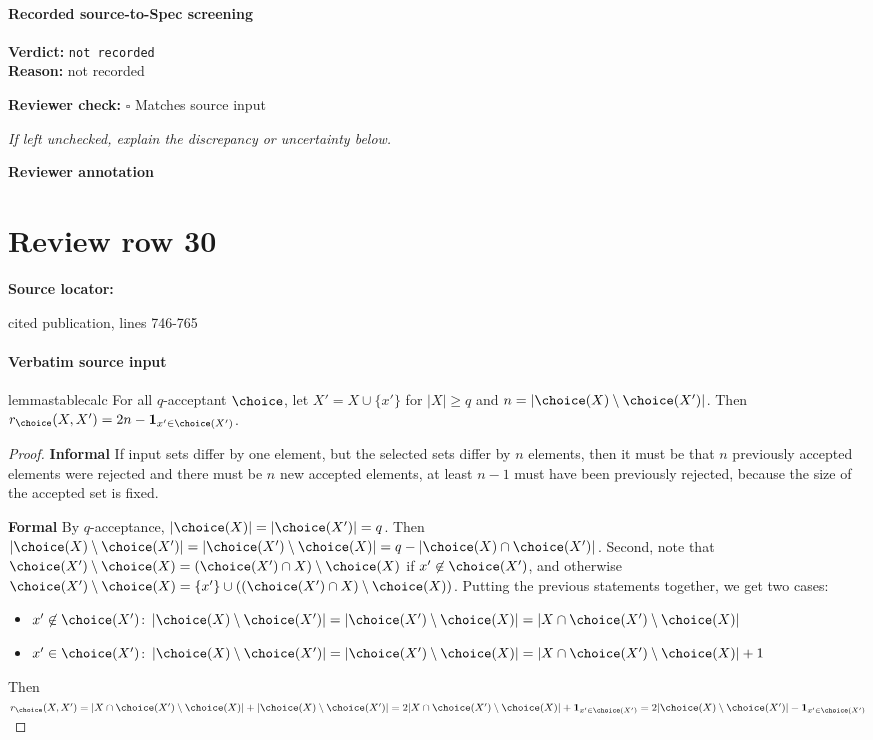 \documentclass[10pt]{article}
\newcommand{\reviewerbox}{%
  \par\noindent\fbox{\parbox{0.96\linewidth}{\rule{0pt}{0.38in}}}\par
}
\newcommand{\reviewmatch}[1]{%
  \par\noindent\textbf{Reviewer check:} $\square$\; #1\par
  \noindent\emph{If left unchecked, explain the discrepancy or uncertainty below.}\par
}
\begin{document}
\paragraph{Recorded source-to-Spec screening}
\textbf{Verdict:} \texttt{not recorded}
\\
\textbf{Reason:} not recorded
\reviewmatch{Matches source input}
\noindent\textbf{Reviewer annotation}\par
\reviewerbox
\clearpage
\hypertarget{source-claim-760d01f2c31e3672}{}
\section*{Review row 30}
\textbf{Source locator:} {\footnotesize\raggedright cited publication, lines 746-\allowbreak{}765\par}
\paragraph{Verbatim source input}
\begin{ReviewVerbatim}
\begin{restatable}{lemma}{stablecalc}
\label{lem:unstable-calc}
For all $q$-acceptant $\choice$, let $X' = X \cup \{x'\}$ for $|X| \geq q$ and $n = |\choice(X) \setminus \choice(X')|$.  Then
$r_\choice(X, X') = 2n-\mathbf{1}_{x'\in\choice(X')}$.
\end{restatable}

\begin{proof}
\textbf{Informal}
If input sets differ by one element, but the selected sets differ by $n$ elements, then it must be that $n$ previously accepted elements were rejected and there must be $n$ new accepted elements, at least $n-1$ must have been previously rejected, because the size of the accepted set is fixed.

\textbf{Formal}
By $q$-acceptance, $|\choice(X)| = |\choice(X')| = q$. Then $|\choice(X) \setminus \choice(X')| = |\choice(X') \setminus \choice(X)| = q-|\choice(X) \cap \choice(X')|$.
Second, note that $\choice(X') \setminus \choice(X) = (\choice(X') \cap X) \setminus \choice(X)$ if $x' \not\in \choice(X')$, and otherwise $\choice(X') \setminus \choice(X) = \{x'\} \cup \left((\choice(X') \cap X) \setminus \choice(X)\right)$.
Putting the previous statements together, we get two cases:
\begin{itemize}
    \item $x' \not\in \choice(X')$: $|\choice(X) \setminus \choice(X')| = |\choice(X') \setminus \choice(X)| = |X \cap \choice(X') \setminus \choice(X)|$
    \item $x' \in \choice(X')$: $|\choice(X) \setminus \choice(X')| = |\choice(X') \setminus \choice(X)| = |X \cap \choice(X') \setminus \choice(X)| + 1$
\end{itemize}
Then $r_\choice(X, X') = |X \cap \choice(X') \setminus \choice(X)| + |\choice(X) \setminus \choice(X')| = 2|X \cap \choice(X') \setminus \choice(X)| + \mathbf{1}_{x'\in\choice(X')} = 2|\choice(X) \setminus \choice(X')| - \mathbf{1}_{x'\in\choice(X')}$
\end{proof}
\end{ReviewVerbatim}
\end{document}

